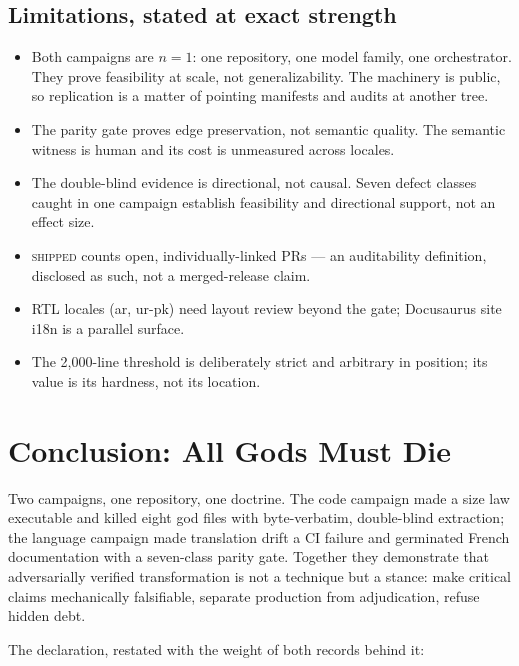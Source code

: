 \documentclass[11pt]{article}
\theoremstyle{definition}
\theoremstyle{plain}
\theoremstyle{remark}
\begin{document}
\subsection{Limitations, stated at exact strength}

\begin{itemize}[leftmargin=*]
\item Both campaigns are $n=1$: one repository, one model family, one
  orchestrator. They prove feasibility at scale, not generalizability. The
  machinery is public, so replication is a matter of pointing manifests and
  audits at another tree.
\item The parity gate proves edge preservation, not semantic quality. The
  semantic witness is human and its cost is unmeasured across locales.
\item The double-blind evidence is directional, not causal. Seven defect
  classes caught in one campaign establish feasibility and directional
  support, not an effect size.
\item \textsc{shipped} counts open, individually-linked PRs --- an
  auditability definition, disclosed as such, not a merged-release claim.
\item RTL locales (ar, ur-pk) need layout review beyond the gate; Docusaurus
  site i18n is a parallel surface.
\item The 2{,}000-line threshold is deliberately strict and arbitrary in
  position; its value is its hardness, not its location.
\end{itemize}

\section{Conclusion: All Gods Must Die}
\label{sec:synthesis-conclusion}

Two campaigns, one repository, one doctrine. The code campaign made a size
law executable and killed eight god files with byte-verbatim, double-blind
extraction; the language campaign made translation drift a CI failure and
germinated French documentation with a seven-class parity gate. Together
they demonstrate that adversarially verified transformation is not a
technique but a stance: make critical claims mechanically falsifiable,
separate production from adjudication, refuse hidden debt.

The declaration, restated with the weight of both records behind it:
\end{document}
